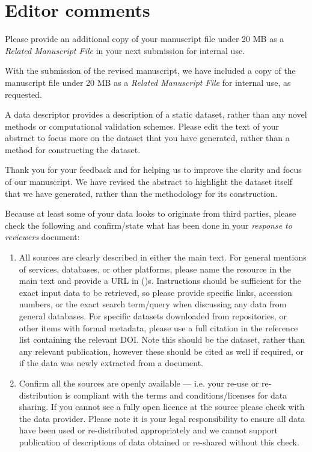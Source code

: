\documentclass{response}
\begin{document}
\section*{Editor comments}

\EC Please provide an additional copy of your manuscript file under 20 MB as a \textit{Related Manuscript File} in your next submission for internal use.

\AR With the submission of the revised manuscript, we have included a copy of the manuscript file under 20 MB as a \textit{Related Manuscript File} for internal use, as requested.

\EC A data descriptor provides a description of a static dataset, rather than any novel methods or computational validation schemes. Please edit the text of your abstract to focus more on the dataset that you have generated, rather than a method for constructing the dataset.

\AR Thank you for your feedback and for helping us to improve the clarity and focus of our manuscript. We have revised the abstract to highlight the dataset itself that we have generated, rather than the methodology for its construction.

\EC Because at least some of your data looks to originate from third parties, please check the following and confirm/state what has been done in your \textit{response to reviewers} document:
\begin{enumerate}
    \item All sources are clearly described in either the main text. For general mentions of services, databases, or other platforms, please name the resource in the main text and provide a URL in ()s. Instructions should be sufficient for the exact input data to be retrieved, so please provide specific links, accession numbers, or the exact search term/query when discussing any data from general databases. For specific datasets downloaded from repositories, or other items with formal metadata, please use a full citation in the reference list containing the relevant DOI. Note this should be the dataset, rather than any relevant publication, however these should be cited as well if required, or if the data was newly extracted from a document.
    \item Confirm all the sources are openly available --- i.e. your re-use or re-distribution is compliant with the terms and conditions/licenses for data sharing. If you cannot see a fully open licence at the source please check with the data provider. Please note it is your legal responsibility to ensure all data have been used or re-distributed appropriately and we cannot support publication of descriptions of data obtained or re-shared without this check.
\end{enumerate}
\end{document}
